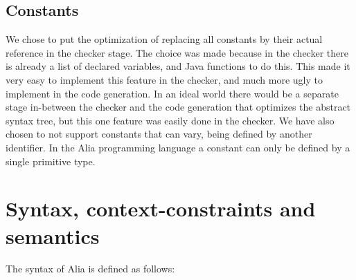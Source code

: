 \documentclass[paper=a4, fontsize=11pt]{article}
\numberwithin{equation}{section}		%
\numberwithin{figure}{section}			%
\numberwithin{table}{section}				%
\begin{document}
\subsection{Constants}
We chose to put the optimization of replacing all constants by their actual reference in the checker stage. The choice was made because in the checker there is already a list of declared variables, and Java functions to do this. This made it very easy to implement this feature in the checker, and much more ugly to implement in the code generation. In an ideal world there would be a separate stage in-between the checker and the code generation that optimizes the abstract syntax tree, but this one feature was easily done in the checker. We have also chosen to not support constants that can vary, being defined by another identifier. In the Alia programming language a constant can only be defined by a single primitive type.



\section{Syntax, context-constraints and semantics}
The syntax of Alia is defined as follows:
\end{document}
